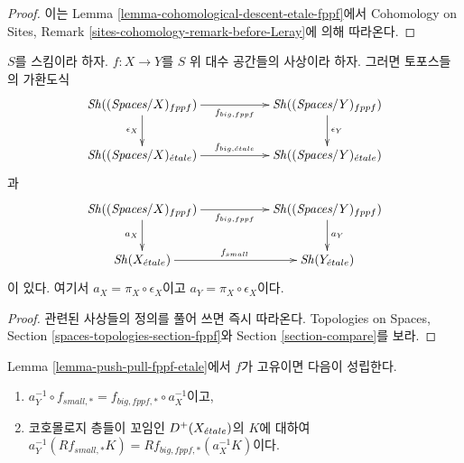 \begin{proof}
이는 Lemma \ref{lemma-cohomological-descent-etale-fppf}에서
Cohomology on Sites, Remark
\ref{sites-cohomology-remark-before-Leray}에 의해 따라온다.
\end{proof}

\begin{lemma}
\label{lemma-push-pull-fppf-etale}
$S$를 스킴이라 하자.
$f : X \to Y$를 $S$ 위 대수 공간들의 사상이라 하자.
그러면 토포스들의 가환도식
$$
\xymatrix{
\Sh((\textit{Spaces}/X)_{fppf}) \ar[rr]_{f_{big, fppf}} \ar[d]_{\epsilon_X} & &
\Sh((\textit{Spaces}/Y)_{fppf}) \ar[d]^{\epsilon_Y} \\
\Sh((\textit{Spaces}/X)_\etale) \ar[rr]^{f_{big, \etale}} & &
\Sh((\textit{Spaces}/Y)_\etale)
}
$$
과
$$
\xymatrix{
\Sh((\textit{Spaces}/X)_{fppf}) \ar[rr]_{f_{big, fppf}} \ar[d]_{a_X} & &
\Sh((\textit{Spaces}/Y)_{fppf}) \ar[d]^{a_Y} \\
\Sh(X_\etale) \ar[rr]^{f_{small}} & &
\Sh(Y_\etale)
}
$$
이 있다. 여기서 $a_X = \pi_X \circ \epsilon_X$이고
$a_Y = \pi_X \circ \epsilon_X$이다.
\end{lemma}

\begin{proof}
관련된 사상들의 정의를 풀어 쓰면 즉시 따라온다.
Topologies on Spaces, Section
\ref{spaces-topologies-section-fppf}와 Section \ref{section-compare}를 보라.
\end{proof}

\begin{lemma}
\label{lemma-proper-push-pull-fppf-etale}
Lemma \ref{lemma-push-pull-fppf-etale}에서 $f$가 고유이면 다음이 성립한다.
\begin{enumerate}
\item $a_Y^{-1} \circ f_{small, *} = f_{big, fppf, *} \circ a_X^{-1}$이고,
\item 코호몰로지 층들이 꼬임인 $D^+(X_{\acute{e}tale})$의 $K$에 대하여\\
$a_Y^{-1}(Rf_{small, *}K) = Rf_{big, fppf, *}(a_X^{-1}K)$이다.
\end{enumerate}
\end{lemma}

